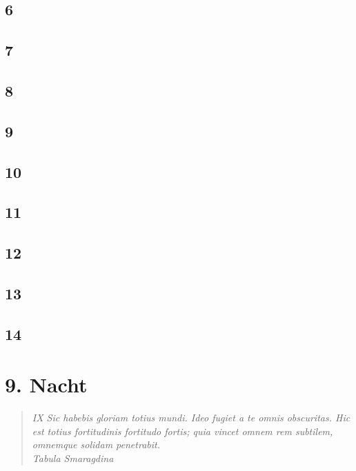 \documentclass[11pt,titlepage,a5paper]{book}
\begin{document}
\section*{6}

\section*{7}

\section*{8}

\section*{9}

\section*{10}

\section*{11}

\section*{12}

\section*{13}

\section*{14}

\chapter*{9. Nacht}

\begin{quotation}

\emph{IX Sic habebis gloriam totius mundi. Ideo fugiet a te omnis obscuritas. Hic est totius fortitudinis fortitudo fortis; quia vincet omnem rem subtilem, omnemque solidam penetrabit.  \\Tabula Smaragdina}

\end{quotation}
\end{document}
